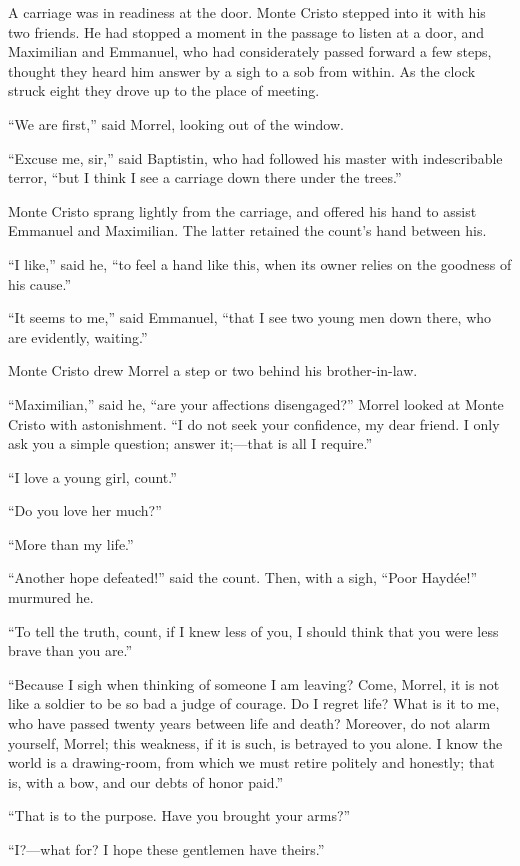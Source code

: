 A carriage was in readiness at the door. Monte Cristo stepped into it
with his two friends. He had stopped a moment in the passage to listen
at a door, and Maximilian and Emmanuel, who had considerately passed
forward a few steps, thought they heard him answer by a sigh to a sob
from within. As the clock struck eight they drove up to the place of
meeting.

“We are first,” said Morrel, looking out of the window.

“Excuse me, sir,” said Baptistin, who had followed his master with
indescribable terror, “but I think I see a carriage down there under
the trees.”

Monte Cristo sprang lightly from the carriage, and offered his hand to
assist Emmanuel and Maximilian. The latter retained the count’s hand
between his.

“I like,” said he, “to feel a hand like this, when its owner relies on
the goodness of his cause.”

“It seems to me,” said Emmanuel, “that I see two young men down there,
who are evidently, waiting.”

Monte Cristo drew Morrel a step or two behind his brother-in-law.

“Maximilian,” said he, “are your affections disengaged?” Morrel looked
at Monte Cristo with astonishment. “I do not seek your confidence, my
dear friend. I only ask you a simple question; answer it;—that is all I
require.”

“I love a young girl, count.”

“Do you love her much?”

“More than my life.”

“Another hope defeated!” said the count. Then, with a sigh, “Poor
Haydée!” murmured he.

“To tell the truth, count, if I knew less of you, I should think that
you were less brave than you are.”

“Because I sigh when thinking of someone I am leaving? Come, Morrel, it
is not like a soldier to be so bad a judge of courage. Do I regret
life? What is it to me, who have passed twenty years between life and
death? Moreover, do not alarm yourself, Morrel; this weakness, if it is
such, is betrayed to you alone. I know the world is a drawing-room,
from which we must retire politely and honestly; that is, with a bow,
and our debts of honor paid.”

“That is to the purpose. Have you brought your arms?”

“I?—what for? I hope these gentlemen have theirs.”

